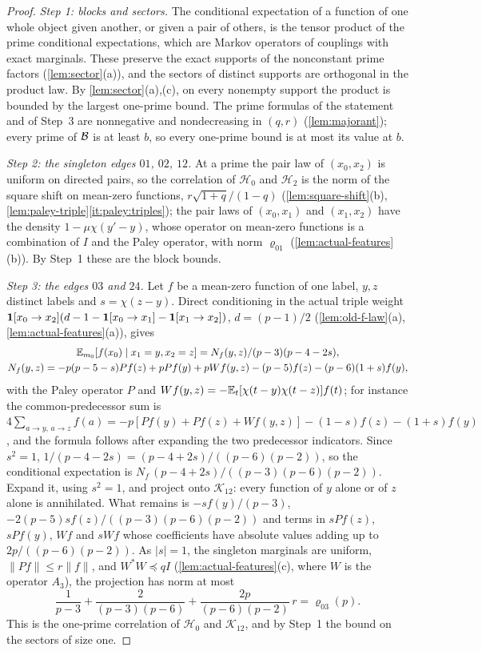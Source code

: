 \begin{proof}
\emph{Step 1: blocks and sectors.} The conditional expectation of a function
of one whole object given another, or given a pair of others, is the tensor
product of the prime conditional expectations, which are Markov operators of
couplings with exact marginals. These preserve the exact supports of the
nonconstant prime factors (\cref{lem:sector}(a)), and the sectors of distinct
supports are orthogonal in the product law. By \cref{lem:sector}(a),(c), on every
nonempty support the product is bounded by the largest one-prime bound. The
prime formulas of the statement and of Step~3 are nonnegative and nondecreasing in
$(q,r)$ (\cref{lem:majorant}); every prime of $\mathcal B$ is at least $b$, so every
one-prime bound is at most its value at $b$.

\emph{Step 2: the singleton edges $01$, $02$, $12$.} At a prime the pair law of
$(x_0,x_2)$ is uniform on directed pairs, so the correlation of $\mathcal H_0$ and
$\mathcal H_2$ is the norm of the square shift on mean-zero functions,
$r\sqrt{1+q}/(1-q)$ (\cref{lem:square-shift}(b),
\cref{lem:paley-triple}\ref{it:paley:triples}); the pair laws of $(x_0,x_1)$ and
$(x_1,x_2)$ have the density $1-\mu\chi(y'-y)$, whose operator on mean-zero
functions is a combination of $I$ and the Paley operator, with norm
$\varrho_{01}$ (\cref{lem:actual-features}(b)). By Step~1 these are the block bounds.

\emph{Step 3: the edges $03$ and $24$.} Let $f$ be a mean-zero function of one
label, $y,z$ distinct labels and $s=\chi(z-y)$. Direct conditioning in the actual
triple weight $\mathbf 1[x_0\to x_2](d-1-\mathbf 1[x_0\to x_1]-\mathbf 1[x_1\to x_2])$,
$d=(p-1)/2$ (\cref{lem:old-f-law}(a), \cref{lem:actual-features}(a)), gives
\begin{gather*}
 \mathbb E_{m_0}[f(x_0)\mid x_1=y,x_2=z]=N_f(y,z)/(p-3)(p-4-2s),\\
 N_f(y,z)=-p(p-5-s)Pf(z)+pPf(y)+pWf(y,z)-(p-5)f(z)-(p-6)(1+s)f(y),
\end{gather*}
with the Paley operator $P$ and $Wf(y,z)=-\mathbb E_t[\chi(t-y)\chi(t-z)]f(t)$; for
instance the common-predecessor sum is
$4\sum_{a\to y,\,a\to z}f(a)=-p[Pf(y)+Pf(z)+Wf(y,z)]-(1-s)f(z)-(1+s)f(y)$, and
the formula follows after expanding the two predecessor indicators. Since $s^2=1$,
$1/(p-4-2s)=(p-4+2s)/((p-6)(p-2))$, so the conditional expectation is
$N_f\,(p-4+2s)/((p-3)(p-6)(p-2))$. Expand it, using $s^2=1$, and project onto
$\mathcal K_{12}$: every function of $y$ alone or of $z$ alone is annihilated.
What remains is $-sf(y)/(p-3)$, $-2(p-5)sf(z)/((p-3)(p-6)(p-2))$ and terms in $sPf(z)$,
$sPf(y)$, $Wf$ and $sWf$ whose coefficients have absolute values adding up to
$2p/((p-6)(p-2))$. As $|s|=1$, the singleton marginals are uniform,
$\|Pf\|\le r\|f\|$, and $W^*W\preceq qI$ (\cref{lem:actual-features}(c), where $W$ is
the operator $A_3$), the projection has norm at most
\[
 \frac1{p-3}+\frac2{(p-3)(p-6)}+\frac{2p}{(p-6)(p-2)}\,r=\varrho_{03}(p).
\]
This is the one-prime correlation of $\mathcal H_0$ and $\mathcal K_{12}$, and by
Step~1 the bound on the sectors of size one.


\end{proof}
